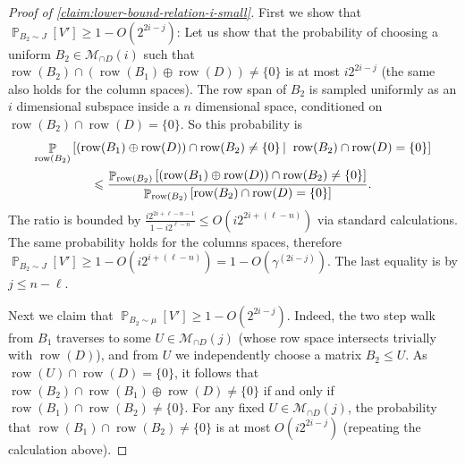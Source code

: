 \documentclass[10pt,a4paper]{article}
\newcommand{\prettyref}[1]{\cref{#1}}
\theoremstyle{definition}
\theoremstyle{remark}
\newcommand{\set}[1]{\{#1\}}
\newcommand{\Psymb}{\mathbb{P}}
\DeclareMathOperator*{\ProbOp}{\Psymb}
\renewcommand{\Pr}{\ProbOp}
\newcommand{\Prob}[2][]{\Pr_{{#1}}\left[#2\right]} %
\newcommand{\cProb}[3]{\Pr_{{#1}}\left[ #2 \left| \; \vphantom{#2 #3} \right. #3  \right]} %
\DeclareMathOperator{\row}{row}
\renewcommand{\leq}{\leqslant}
\renewcommand{\geq}{\geqslant}
\numberwithin{equation}{section}
\let\pref=\prettyref
\def\MP{\mathcal{M}}
\begin{document}
\begin{proof}[Proof of \pref{claim:lower-bound-relation-i-small}]
First we show that \(\Prob[B_2 \sim J]{V'} \geq 1-O(2^{2i-j})\): Let us show that the probability of choosing a uniform \(B_2 \in \MP_{\cap D}(i)\) such that \(\row(B_2) \cap (\row(B_1) \oplus \row(D)) \ne \set{0}\) is at most \(i2^{2i-j}\) (the same also holds for the column spaces). The row span of \(B_2\) is sampled uniformly as an \(i\) dimensional subspace inside a \(n\) dimensional space, conditioned on \(\row(B_2) \cap \row(D) = \{0\}\). So this probability is 
\begin{multline*}
    \cProb{\row(B_2)}{(\row(B_1) \oplus \row(D)) \cap \row(B_2) \ne \set{0}}{\row(B_2) \cap \row(D) = \set{0}}\\
    \leq \frac{\Prob[\row(B_2)]{(\row(B_1) \oplus \row(D)) \cap \row(B_2) \ne \set{0}}}{\Prob[\row(B_2)]{\row(B_2) \cap \row(D) = \set{0}}}.
\end{multline*}
The ratio is bounded by \(\frac{i2^{2i+\ell-n-1}}{1-i2^{\ell-n}} \leq O(i2^{2i +(\ell-n)})\) via standard calculations. The same probability holds for the columns spaces, therefore \(\Prob[B_2 \sim J]{V'} \geq 1-O(i2^{i +(\ell-n)}) = 1-O(\gamma^{(2i-j)})\). The last equality is by \(j \leq n-\ell\).

Next we claim that \(\Prob[B_2 \sim \mu]{V'} \geq 1-O(2^{2i-j})\). Indeed, the two step walk from \(B_1\) traverses to some \(U \in \MP_{\cap D}(j)\) (whose row space intersects trivially with \(\row(D)\)), and from \(U\) we independently choose a matrix \(B_2 \leq U\). As \(\row(U) \cap \row(D) = \set{0}\), it follows that \(\row(B_2) \cap \row(B_1) \oplus \row(D) \ne \set{0}\) if and only if \(\row(B_1) \cap \row(B_2) \ne \set{0}\). For any fixed \(U \in \MP_{\cap D}(j)\), the probability that \(\row(B_1) \cap \row(B_2) \ne \set{0}\) is at most \(O(i2^{2i-j})\) (repeating the calculation above).

\medskip


\end{proof}
\end{document}
